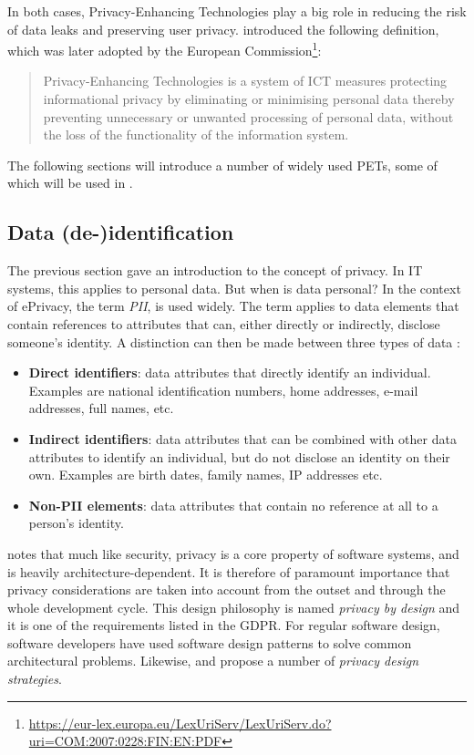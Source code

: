 In both cases, Privacy-Enhancing Technologies play a big role in reducing the risk of data leaks and preserving user privacy. \citeauthor{pets-handbook} introduced the following definition, which was later adopted by the European Commission\footnote{\url{https://eur-lex.europa.eu/LexUriServ/LexUriServ.do?uri=COM:2007:0228:FIN:EN:PDF}}:
\begin{quote}{\citeauthor{pets-handbook}}
    Privacy-Enhancing Technologies is a system of ICT measures protecting informational privacy by eliminating or minimising personal data thereby preventing unnecessary or unwanted processing of personal data, without the loss of the functionality of the information system.
\end{quote} 
The following sections will introduce a number of widely used \gls{PETs}, some of which will be used in \middleware{}.

\subsection{Data (de-)identification}
\label{sec:data-deid}
The previous section gave an introduction to the concept of privacy. In IT systems, this applies to personal data. But when is data personal? In the context of ePrivacy, the term \textit{\gls{PII}}, is used widely. The term applies to data elements that contain references to attributes that can, either directly or indirectly, disclose someone's identity. A distinction can then be made between three types of data \citep{de-id-taxonomy}:
\begin{itemize}
    \item \textbf{Direct identifiers}: data attributes that directly identify an individual. Examples are national identification numbers, home addresses, e-mail addresses, full names, etc.
    \item \textbf{Indirect identifiers}: data attributes that can be combined with other data attributes to identify an individual, but do not disclose an identity on their own. Examples are birth dates, family names, IP addresses etc.
    \item \textbf{Non-PII elements}: data attributes that contain no reference at all to a person's identity.
\end{itemize}
\noindent \citeauthor{privacy-design-strategies} notes that much like security, privacy is a core property of software systems, and is heavily architecture-dependent. It is therefore of paramount importance that privacy considerations are taken into account from the outset and through the whole development cycle. This design philosophy is named \textit{privacy by design} and it is one of the requirements listed in the GDPR. For regular software design, software developers have used software design patterns to solve common architectural problems. Likewise, \citet{privacy-design-strategies} and \citet{de-id-taxonomy} propose a number of \textit{privacy design strategies}.


